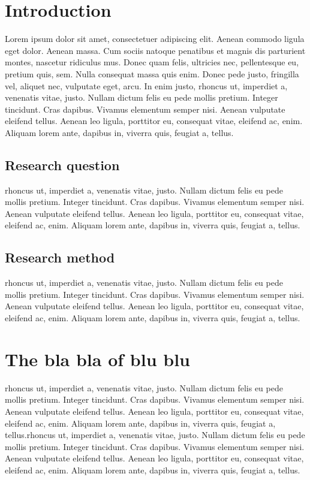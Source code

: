 \thepage
\section{Introduction}
Lorem ipsum dolor sit amet, consectetuer adipiscing elit. Aenean commodo ligula eget dolor. Aenean massa. Cum sociis natoque penatibus et magnis dis parturient montes, nascetur ridiculus mus. Donec quam felis, ultricies nec, pellentesque eu, pretium quis, sem. Nulla consequat massa quis enim. Donec pede justo, fringilla vel, aliquet nec, vulputate eget, arcu. In enim justo, rhoncus ut, imperdiet a, venenatis vitae, justo. Nullam dictum felis eu pede mollis pretium. Integer tincidunt. Cras dapibus. Vivamus elementum semper nisi. Aenean vulputate eleifend tellus. Aenean leo ligula, porttitor eu, consequat vitae, eleifend ac, enim. Aliquam lorem ante, dapibus in, viverra quis, feugiat a, tellus.

\subsection{Research question}

rhoncus ut, imperdiet a, venenatis vitae, justo. Nullam dictum felis eu pede mollis pretium. Integer tincidunt. Cras dapibus. Vivamus elementum semper nisi. Aenean vulputate eleifend tellus. Aenean leo ligula, porttitor eu, consequat vitae, eleifend ac, enim. Aliquam lorem ante, dapibus in, viverra quis, feugiat a, tellus.

\subsection{Research method}
rhoncus ut, imperdiet a, venenatis vitae, justo. Nullam dictum felis eu pede mollis pretium. Integer tincidunt. Cras dapibus. Vivamus elementum semper nisi. Aenean vulputate eleifend tellus. Aenean leo ligula, porttitor eu, consequat vitae, eleifend ac, enim. Aliquam lorem ante, dapibus in, viverra quis, feugiat a, tellus.

\section{The bla bla of blu blu}

rhoncus ut, imperdiet a, venenatis vitae, justo. Nullam dictum felis eu pede mollis pretium. Integer tincidunt. Cras dapibus. Vivamus elementum semper nisi. Aenean vulputate eleifend tellus. Aenean leo ligula, porttitor eu, consequat vitae, eleifend ac, enim. Aliquam lorem ante, dapibus in, viverra quis, feugiat a, tellus.rhoncus ut, imperdiet a, venenatis vitae, justo. Nullam dictum felis eu pede mollis pretium. Integer tincidunt. Cras dapibus. Vivamus elementum semper nisi. Aenean vulputate eleifend tellus. Aenean leo ligula, porttitor eu, consequat vitae, eleifend ac, enim. Aliquam lorem ante, dapibus in, viverra quis, feugiat a, tellus.

